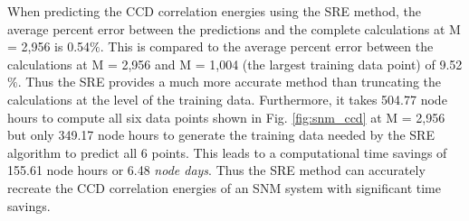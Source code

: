 When predicting the CCD correlation energies using the SRE method, the average percent error between the predictions and the complete calculations at M = 2,956 is 0.54$\%$. This is compared to the average percent error between the calculations at M = 2,956 and M = 1,004 (the largest training data point) of 9.52$\%$. Thus the SRE provides a much more accurate method than truncating the calculations at the level of the training data. Furthermore, it takes 504.77 node hours to compute all six data points shown in Fig. \ref{fig:snm_ccd} at M = 2,956 but only 349.17 node hours to generate the training data needed by the SRE algorithm to predict all 6 points. This leads to a computational time savings of 155.61 node hours or 6.48 \textit{node days}. Thus the SRE method can accurately recreate the CCD correlation energies of an SNM system with significant time savings.